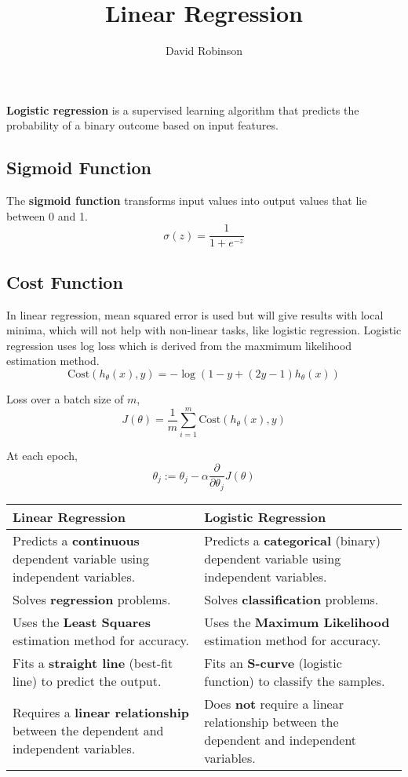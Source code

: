 \documentclass{article}
\title{Linear Regression}
\author{David Robinson}
\date{}
\begin{document}
\maketitle

\textbf{Logistic regression} is a supervised learning algorithm that predicts the probability of a binary outcome based on input features.

\subsection*{Sigmoid Function}

The \textbf{sigmoid function} transforms input values into output values that lie between 0 and 1.
\[\sigma(z)=\frac{1}{1+e^{-z}}\]

\subsection*{Cost Function}

In linear regression, mean squared error is used but will give results with local minima, which will not help with non-linear tasks, like logistic regression. Logistic regression uses log loss which is derived from the maxmimum likelihood estimation method.
\[\text{Cost}(h_\theta(x),y)=-\log(1-y+(2y-1)h_\theta(x))\]

Loss over a batch size of $m$,
\[J(\theta)=\frac{1}{m}\sum_{i=1}^m \text{Cost}(h_\theta(x),y)\]


At each epoch,
\[\theta_j := \theta_j-\alpha\frac{\partial}{\partial\theta_j}J(\theta)\]
\vspace{1em}
\centering
\renewcommand{\arraystretch}{1.5}
\begin{tabularx}{\textwidth}{|X|X|}
    \hline
    \textbf{Linear Regression} & \textbf{Logistic Regression} \\
    \hline
    Predicts a \textbf{continuous} dependent variable using independent variables. & Predicts a \textbf{categorical} (binary) dependent variable using independent variables. \\
    \hline
    Solves \textbf{regression} problems. & Solves \textbf{classification} problems. \\
    \hline
    Uses the \textbf{Least Squares} estimation method for accuracy. & Uses the \textbf{Maximum Likelihood} estimation method for accuracy. \\
    \hline
    Fits a \textbf{straight line} (best-fit line) to predict the output. & Fits an \textbf{S-curve} (logistic function) to classify the samples. \\
    \hline
    Requires a \textbf{linear relationship} between the dependent and independent variables. & Does \textbf{not} require a linear relationship between the dependent and independent variables. \\
    \hline
\end{tabularx}
\end{document}
